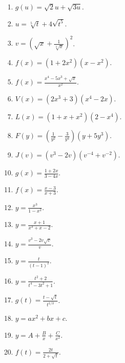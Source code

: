 \begin{problem}
\begin{multicols}{2}
\begin{enumerate}
\answer{$ $}
\item $g(u)=\sqrt 2 u +\sqrt{3u}$.

\answer{$ $}
\item $u=\sqrt[5]t+4\sqrt{t^5}$.

\answer{$ $}
\item $v=\left(\sqrt{x}+\frac{1}{\sqrt[3]{x}}\right)^2$.

\answer{$ $}
\item $f(x)=(1+2x^2)(x-x^2)$.

\answer{$ $}
\item $f(x)=\frac{x^4-5x^3+\sqrt{x}}{x^2}$.

\answer{$ $}
\item $V(x)=(2x^3+3)(x^4-2x)$.

\answer{$ $}
\item $L(x)=(1+x+x^2)(2-x^4)$.

\answer{$ $}
\item $F(y)=\left(\frac{1}{y^2}-\frac{3}{y^4} \right)(y+5y^3)$.

\answer{$ $}
\item $J(v)=(v^3-2v)(v^{-4}+v^{-2})$.

\answer{$ $}
\item $g(x)=\frac{1+2x}{3-4x}$.

\answer{$ $}
\item $f(x)=\frac{x-3}{x+3}$.

\answer{$ $}
\item $y=\frac{x^3}{1-x^2}$.

\answer{$ $}
\item $y=\frac{x+1}{x^3+x-2}$.

\answer{$ $}
\item $y=\frac{v^3-2v\sqrt{v}}{v}$.

\answer{$ $}
\item $y=\frac{t}{(t-1)^2}$.

\answer{$ $}
\item $y=\frac{t^2+2}{t^4-3t^2+1}$.

\answer{$ $}
\item $g(t)=\frac{t-\sqrt{t}}{t^{1/3}}$.

\answer{$ $}
\item $y=a x^2+b x + c$.

\answer{$ $}
\item $y=A+\frac{B}x +\frac{C}{x^2}$.

\answer{$ $}
\item $f(t)=\frac{2t}{2+\sqrt{t}}$.


\end{enumerate}
\end{multicols}
\end{problem}
